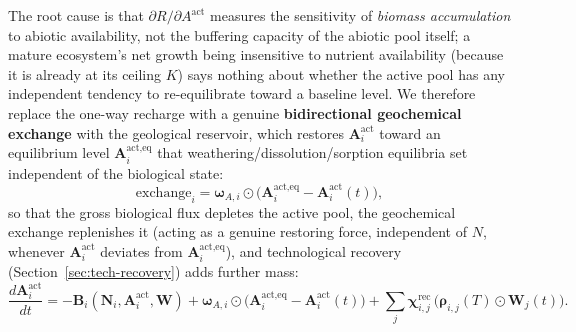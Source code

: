 \documentclass[twocolumn,10pt]{article}
\begin{document}
The root cause is that $\partial R/\partial A^{\text{act}}$ measures the sensitivity of \emph{biomass accumulation} to abiotic availability, not the buffering capacity of the abiotic pool itself; a mature ecosystem's net growth being insensitive to nutrient availability (because it is already at its ceiling $K$) says nothing about whether the active pool has any independent tendency to re-equilibrate toward a baseline level. We therefore replace the one-way recharge with a genuine \textbf{bidirectional geochemical exchange} with the geological reservoir, which restores $\mathbf A^{\text{act}}_i$ toward an equilibrium level $\mathbf A^{\text{act},\text{eq}}_i$ that weathering/dissolution/sorption equilibria set independent of the biological state:
\[
\text{exchange}_i = \boldsymbol\omega_{A,i}\odot\bigl(\mathbf A^{\text{act},\text{eq}}_i - \mathbf A^{\text{act}}_i(t)\bigr),
\]
so that the gross biological flux depletes the active pool, the geochemical exchange replenishes it (acting as a genuine restoring force, independent of $N$, whenever $\mathbf A^{\text{act}}_i$ deviates from $\mathbf A^{\text{act},\text{eq}}_i$), and technological recovery (Section~\ref{sec:tech-recovery}) adds further mass:
\begin{equation}
\frac{d\mathbf{A}^{\text{act}}_i}{dt} = -\mathbf{B}_i(\mathbf{N}_i,\mathbf A^{\text{act}}_i,\mathbf{W}) + \boldsymbol\omega_{A,i}\odot\bigl(\mathbf A^{\text{act},\text{eq}}_i-\mathbf{A}^{\text{act}}_i(t)\bigr) + \sum_j \boldsymbol{\chi}^{\text{rec}}_{i,j}\,\bigl( \boldsymbol{\rho}_{i,j}(T) \odot \mathbf{W}_j(t) \bigr). \label{eq:abiotic}
\end{equation}
\end{document}
